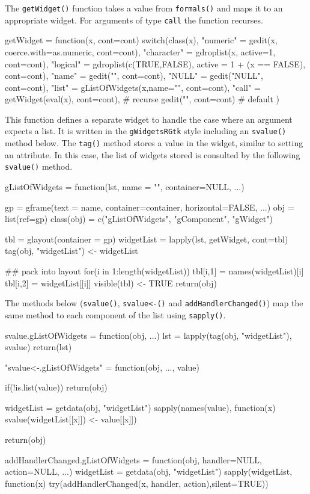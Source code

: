 \documentclass[12pt]{article}
\newcommand{\RCode}[1]{\texttt{#1}}
\newcommand{\RFunc}[1]{\texttt{#1()}}
\begin{document}
The \RFunc{getWidget} function takes a value from \RFunc{formals}
and maps it to an appropriate widget. For arguments of type
\RCode{call} the function recurses.

\begin{Scode}
  getWidget = function(x, cont=cont) {
    switch(class(x),
    "numeric" = gedit(x, coerce.with=as.numeric, cont=cont),
    "character" = gdroplist(x, active=1, cont=cont),
    "logical" = gdroplist(c(TRUE,FALSE), active = 1 + (x == FALSE), cont=cont),
    "name" = gedit("", cont=cont),
    "NULL" = gedit("NULL", cont=cont),
    "list" = gListOfWidgets(x,name="", cont=cont), 
    "call" = getWidget(eval(x), cont=cont), # recurse
    gedit("", cont=cont)                     # default
    )
  }
\end{Scode}

This function defines a separate widget to handle the case where an
argument expects a list. It is written in the \RCode{gWidgetsRGtk} style
including an \RFunc{svalue} method below. The \RFunc{tag} method stores
a value in the widget, similar to setting an attribute. In this case,
the list of widgets stored is consulted by the following \RFunc{svalue} method.

\begin{Scode}
  gListOfWidgets = function(lst, name = "",  container=NULL, ...) {
    gp = gframe(text = name, container=container, horizontal=FALSE, ...)
    obj = list(ref=gp)
    class(obj) = c("gListOfWidgets", "gComponent", "gWidget")

  tbl = glayout(container = gp)
  widgetList = lapply(lst, getWidget, cont=tbl)
  tag(obj, "widgetList") <-  widgetList

  ## pack into layout
  for(i in 1:length(widgetList)) {
    tbl[i,1] = names(widgetList)[i]
    tbl[i,2] = widgetList[[i]]
  }
  visible(tbl) <- TRUE
  return(obj)
}
\end{Scode}

The methods below (\RFunc{svalue}, \RFunc{svalue<-} and
\RFunc{addHandlerChanged})  map the same method to each component
of the list using \RFunc{sapply}.

\begin{Scode}
  svalue.gListOfWidgets = function(obj,  ...) {
  lst = lapply(tag(obj, "widgetList"), svalue)
  return(lst)
}


"svalue<-.gListOfWidgets" = function(obj, ..., value) {
  if(!is.list(value))
  return(obj)

  widgetList = getdata(obj, "widgetList")
  sapply(names(value), function(x) svalue(widgetList[[x]]) <- value[[x]])

  return(obj)
}

addHandlerChanged.gListOfWidgets = function(obj, handler=NULL, action=NULL, ...) {
  widgetList = getdata(obj, "widgetList")
  sapply(widgetList, function(x)
         try(addHandlerChanged(x, handler, action),silent=TRUE))
}
\end{Scode}
\end{document}
